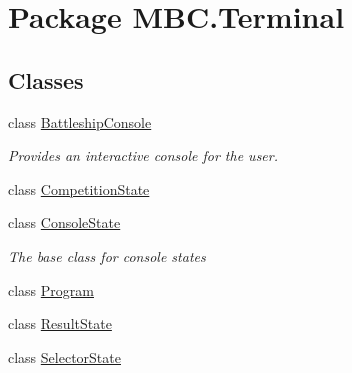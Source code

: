 \hypertarget{namespace_m_b_c_1_1_terminal}{\section{Package M\-B\-C.\-Terminal}
\label{namespace_m_b_c_1_1_terminal}
}
\subsection*{Classes}
\begin{DoxyCompactItemize}
\item 
class \hyperlink{class_m_b_c_1_1_terminal_1_1_battleship_console}{Battleship\-Console}
\begin{DoxyCompactList}\small\item\em Provides an interactive console for the user.\end{DoxyCompactList}\item 
class \hyperlink{class_m_b_c_1_1_terminal_1_1_competition_state}{Competition\-State}
\item 
class \hyperlink{class_m_b_c_1_1_terminal_1_1_console_state}{Console\-State}
\begin{DoxyCompactList}\small\item\em The base class for console states\end{DoxyCompactList}\item 
class \hyperlink{class_m_b_c_1_1_terminal_1_1_program}{Program}
\item 
class \hyperlink{class_m_b_c_1_1_terminal_1_1_result_state}{Result\-State}
\item 
class \hyperlink{class_m_b_c_1_1_terminal_1_1_selector_state}{Selector\-State}
\end{DoxyCompactItemize}
